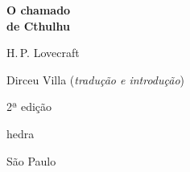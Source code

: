 




\begingroup\thispagestyle{empty}\vspace*{.05\textheight} 

              \formular
              \Huge
              \noindent
              \textbf{O chamado\\ de Cthulhu}
              
              {\brabo\LARGE
              \noindent H.\,P. Lovecraft}
              \vfill

              \newfontfamily{}
              {\fontsize{30}{40}\selectfont\minion\small
              \noindent{}Dirceu Villa (\textit{tradução e introdução})}

              \noindent
              {\fontsize{30}{40}\selectfont\minion\small\noindent 2ª edição}

              \vfill

              \newfontfamily{}
              {\noindent\fontsize{30}{40}\selectfont \timesnewroman hedra}

              \vspace{-0.5cm}
              {\selectfont\minion\small\noindent São Paulo \quad\the\year}

\endgroup
\pagebreak
